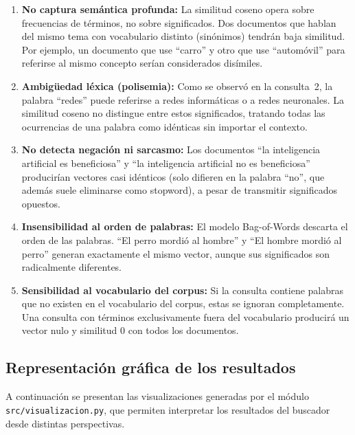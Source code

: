 \begin{enumerate}
    \item \textbf{No captura semántica profunda:} La similitud coseno opera sobre frecuencias de términos, no sobre significados. Dos documentos que hablan del mismo tema con vocabulario distinto (sinónimos) tendrán baja similitud. Por ejemplo, un documento que use ``carro'' y otro que use ``automóvil'' para referirse al mismo concepto serían considerados disímiles.

    \item \textbf{Ambigüedad léxica (polisemia):} Como se observó en la consulta~2, la palabra ``redes'' puede referirse a redes informáticas o a redes neuronales. La similitud coseno no distingue entre estos significados, tratando todas las ocurrencias de una palabra como idénticas sin importar el contexto.

    \item \textbf{No detecta negación ni sarcasmo:} Los documentos ``la inteligencia artificial es beneficiosa'' y ``la inteligencia artificial no es beneficiosa'' producirían vectores casi idénticos (solo difieren en la palabra ``no'', que además suele eliminarse como stopword), a pesar de transmitir significados opuestos.

    \item \textbf{Insensibilidad al orden de palabras:} El modelo Bag-of-Words descarta el orden de las palabras. ``El perro mordió al hombre'' y ``El hombre mordió al perro'' generan exactamente el mismo vector, aunque sus significados son radicalmente diferentes.

    \item \textbf{Sensibilidad al vocabulario del corpus:} Si la consulta contiene palabras que no existen en el vocabulario del corpus, estas se ignoran completamente. Una consulta con términos exclusivamente fuera del vocabulario producirá un vector nulo y similitud 0 con todos los documentos.
\end{enumerate}

\subsection{Representación gráfica de los resultados}

A continuación se presentan las visualizaciones generadas por el módulo \texttt{src/visualizacion.py}, que permiten interpretar los resultados del buscador desde distintas perspectivas.

